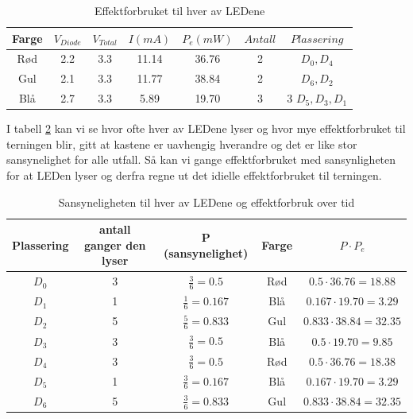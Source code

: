 \begin{table}[!h]
  \centering
  \caption{Effektforbruket til hver av LEDene}
  \begin{tabular}[!h]{ |c|c|c|c|c|c|c| }
    \hline
    Farge &  $V_{Diode}$ & $V_{Total}$ & $I(mA)$ & $P_e(mW)$ & $Antall$ & $Plassering$ \\
    \hline
    Rød & 2.2 & 3.3 & 11.14 & 36.76 & 2 & $D_0, D_4$ \\
    \hline
    Gul & 2.1 & 3.3 & 11.77 & 38.84 & 2 & $D_6, D_2$ \\
    \hline
    Blå & 2.7 & 3.3 & 5.89 & 19.70 & 3 & 3 $D_5, D_3, D_1$\\
    \hline
  \end{tabular}
  \label{table:tab3}
\end{table}

I tabell \ref{table:tab4} kan vi se hvor ofte hver av LEDene lyser og hvor mye effektforbruket til terningen blir, gitt at kastene er uavhengig hverandre og det er like stor sansynelighet for alle utfall. Så kan vi gange effektforbruket med sansynligheten for at LEDen lyser og derfra regne ut det idielle effektforbruket til terningen.



\begin{table}[!h]
  \centering
  \caption{Sansyneligheten til hver av LEDene og effektforbruk over tid}
  \begin{tabular}[!h]{ |c|c|c|c|c| } 
    \hline
    Plassering & antall ganger den lyser & P (sansynelighet) & Farge & $P \cdot P_e$  \\
    \hline
    $D_0$ & 3 & $\frac{3}{6} = 0.5$ & Rød & $0.5 \cdot 36.76 = 18.88$\\
    \hline
    $D_1$ & 1 & $\frac{1}{6} = 0.167$ & Blå & $0.167 \cdot 19.70 = 3.29$\\
    \hline
    $D_2$ & 5 & $\frac{5}{6} = 0.833$ & Gul & $0.833 \cdot 38.84 = 32.35$\\
    \hline
    $D_3$ & 3 & $\frac{3}{6} = 0.5$ & Blå & $0.5 \cdot 19.70 = 9.85$\\
    \hline
    $D_4$ & 3 & $\frac{3}{6} = 0.5$ & Rød & $0.5 \cdot 36.76 = 18.38$\\
    \hline
    $D_5$ & 1 & $\frac{3}{6} = 0.167$ & Blå & $0.167 \cdot 19.70 = 3.29$\\
    \hline
    $D_6$ & 5 & $\frac{3}{6} = 0.833$ & Gul & $0.833 \cdot 38.84 = 32.35$\\
    \hline
  \end{tabular}
  
  \label{table:tab4}
\end{table}

